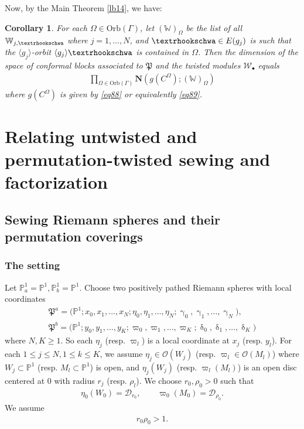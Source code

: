 \documentclass[11pt,b5paper,notitlepage]{article}
\theoremstyle{definition}
\theoremstyle{plain}
\newtheorem{co}[df]{Corollary}
\newcommand{\fk}{\mathfrak}
\newcommand{\mc}{\mathcal}
\newcommand{\bk}[1]{\langle {#1}\rangle}
\newcommand{\scr}{\mathscr}
\newcommand{\blt}{\bullet}
\newcommand{\Wbb}{\mathbb W}
\newcommand{\Pbb}{\mathbb P}
\newcommand{\Nbf}{\mathbf N}
\newcommand{\Orb}{\mathrm{Orb}}
\newcommand{\tipae}{\text{\textrhookschwa}}
\numberwithin{equation}{subsection}
\begin{document}
\begin{subappendices}
Now, by the Main Theorem \ref{lb14}, we have:

\begin{co}\label{lb50}
For each $\Omega\in\Orb(\Gamma)$, let $(\Wbb)_\Omega$ be the list of all $\Wbb_{j,\tipae}$ where $j=1,\dots,N$, and $\tipae\in E(g_j)$ is such that the $\bk{g_j}$-orbit $\bk{g_j}\tipae$ is contained in $\Omega$. Then the dimension of the space of conformal blocks associated to $\fk P$ and the twisted modules $\mc W_\blt$ equals
\begin{align*}
\prod_{\Omega\in\Orb(\Gamma)}\Nbf(g(C^\Omega);(\Wbb)_\Omega)	
\end{align*}
where $g(C^\Omega)$ is given by \eqref{eq88} or equivalently \eqref{eq89}.
\end{co}










	
\end{subappendices}	


\section{Relating untwisted and permutation-twisted sewing and factorization}\label{lb35}

\subsection{Sewing Riemann spheres and their permutation coverings}\label{lb59}


\subsubsection{The setting}\label{lb45}

Let $\Pbb^1_a=\Pbb^1,\Pbb^1_b=\Pbb^1$. Choose two positively pathed Riemann spheres with local coordinates
\begin{gather*}
\fk P^a=\big(\Pbb^1;x_0,x_1,\dots,x_N;\eta_0,\eta_1,\dots,\eta_N;\upgamma_0,\upgamma_1,\dots,\upgamma_N\big),\\
\fk P^b=\big(\Pbb^1;y_0,y_1,\dots,y_K;\varpi_0,\varpi_1,\dots,\varpi_K;\updelta_0,\updelta_1,\dots,\updelta_K\big)	
\end{gather*}
where $N,K\geq 1$. So each $\eta_j$ (resp. $\varpi_l$) is a local coordinate at $x_j$ (resp. $y_l$). For each $1\leq j\leq N,1\leq k\leq K$, we assume $\eta_j\in\scr O(W_j)$ (resp. $\varpi_l\in\scr O(M_l)$) where $W_j\subset\Pbb^1$ (resp. $M_l\subset\Pbb^1$) is open, and $\eta_j(W_j)$ (resp. $\varpi_l(M_l)$) is an open disc centered at $0$ with radius $r_j$ (resp. $\rho_l$). We choose  $r_0,\rho_0>0$ such that
\begin{gather*}
\eta_0(W_0)=\mc D_{r_0},\qquad\varpi_0(M_0)=\mc D_{\rho_0}.	
\end{gather*}
We assume
\begin{align*}
r_0\rho_0>1.	
\end{align*}
\end{document}
